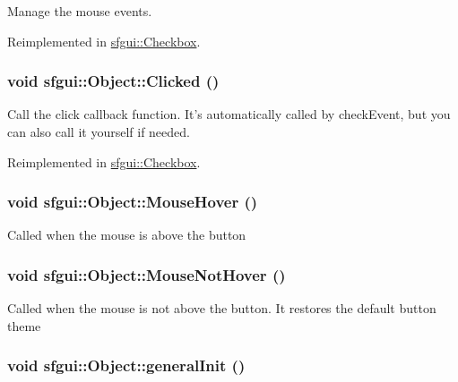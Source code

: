 Manage the mouse events. 

Reimplemented in \hyperlink{classsfgui_1_1Checkbox_a49cffa3e2bef0e96105cd9a9103e294}{sfgui::Checkbox}.\hypertarget{classsfgui_1_1Object_da7f84701d318ce93fe59cc2f571eaf2}{
\subsubsection[Clicked]{\setlength{\rightskip}{0pt plus 5cm}void sfgui::Object::Clicked ()}}
\label{classsfgui_1_1Object_da7f84701d318ce93fe59cc2f571eaf2}




Call the click callback function. It's automatically called by checkEvent, but you can also call it yourself if needed. 

Reimplemented in \hyperlink{classsfgui_1_1Checkbox_9dc5f05d2f6d960d9fd50c77be3b7d6f}{sfgui::Checkbox}.\hypertarget{classsfgui_1_1Object_68d1941ad05b3d0bdf2ba85702c04cc0}{
\subsubsection[MouseHover]{\setlength{\rightskip}{0pt plus 5cm}void sfgui::Object::MouseHover ()}}
\label{classsfgui_1_1Object_68d1941ad05b3d0bdf2ba85702c04cc0}




Called when the mouse is above the button \hypertarget{classsfgui_1_1Object_24575661efb4ab88be76eb2e1a4947e6}{
\subsubsection[MouseNotHover]{\setlength{\rightskip}{0pt plus 5cm}void sfgui::Object::MouseNotHover ()}}
\label{classsfgui_1_1Object_24575661efb4ab88be76eb2e1a4947e6}




Called when the mouse is not above the button. It restores the default button theme \hypertarget{classsfgui_1_1Object_d2750b3d51a3a208739ed6c0c57df6aa}{
\subsubsection[generalInit]{\setlength{\rightskip}{0pt plus 5cm}void sfgui::Object::generalInit ()}}
\label{classsfgui_1_1Object_d2750b3d51a3a208739ed6c0c57df6aa}




